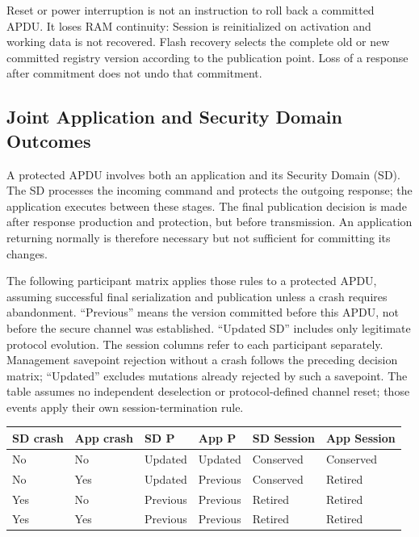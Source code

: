 Reset or power interruption is not an instruction to roll back a committed
APDU. It loses RAM continuity: Session is reinitialized on activation and
working data is not recovered. Flash recovery selects the complete old or
new committed registry version according to the publication point. Loss of
a response after commitment does not undo that commitment.

\subsection{Joint Application and Security Domain Outcomes}
\label{subsec:registry-sd-application-outcomes}

A protected APDU involves both an application and its Security Domain (SD).
The SD processes the incoming command and protects the outgoing response;
the application executes between these stages. The final publication decision
is made after response production and protection, but before transmission.
An application returning normally is therefore necessary but not sufficient
for committing its changes.

The following participant matrix applies those rules to a protected APDU,
assuming successful final serialization and publication unless a crash
requires abandonment. ``Previous''
means the version committed before this APDU, not before the secure channel
was established. ``Updated SD'' includes only legitimate protocol evolution.
The session columns refer to each participant separately. Management
savepoint rejection without a crash follows the preceding decision matrix;
``Updated'' excludes mutations already rejected by such a savepoint.
The table assumes no independent deselection or protocol-defined channel
reset; those events apply their own session-termination rule.

\begin{center}
\small
\renewcommand{\arraystretch}{1.2}
\begin{tabular}{|l|l|l|l|l|l|}
\hline
SD crash & App crash & SD P & App P & SD Session & App Session \\
\hline
No & No & Updated & Updated & Conserved & Conserved \\
No & Yes & Updated & Previous & Conserved & Retired \\
Yes & No & Previous & Previous & Retired & Retired \\
Yes & Yes & Previous & Previous & Retired & Retired \\
\hline
\end{tabular}
\end{center}

